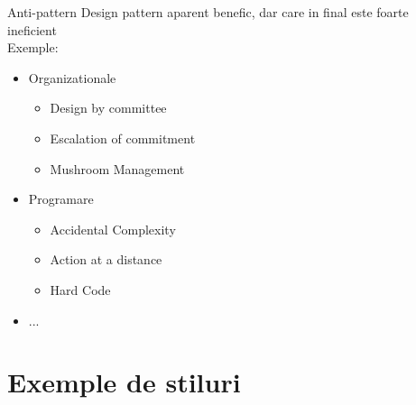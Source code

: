 \documentclass{beamer}
\begin{document}
  \begin{frame}{Anti-pattern}
  Design pattern aparent benefic, dar care in final este foarte ineficient
  \pause \\\vspace{0.3cm}Exemple:\vspace{0.3cm}
  \begin{itemize}
  \item Organizationale \begin{itemize} \item Design by committee \item Escalation of commitment \item Mushroom Management \end{itemize}
  \item Programare \begin{itemize} \item Accidental Complexity \item Action at a distance \item Hard Code \end{itemize}
  \item ...
  \end{itemize}
  \end{frame} 


\section{Exemple de stiluri}

  \frame{\tableofcontents[currentsection]}
\end{document}
